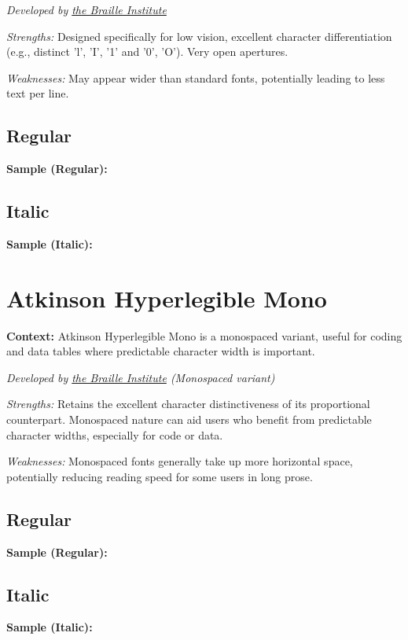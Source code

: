 \emph{Developed by \href{https://brailleinstitute.org/freefont}{the Braille Institute}}
\begin{raggedright}
	\emph{Strengths:} Designed specifically for low vision, excellent character differentiation (e.g., distinct 'l', 'I', '1' and '0', 'O'). Very open apertures.

	\emph{Weaknesses:} May appear wider than standard fonts, potentially leading to less text per line.

	\subsection{Regular}\label{app5:subsec:atkinson-regular}
	\noindent\textbf{Sample (Regular):}
	\FontSample{\atkinsonhyperlegiblefont}

	\subsection{Italic}\label{app5:subsec:atkinson-italic}
	\noindent\textbf{Sample (Italic):}
	\FontSample{{\atkinsonhyperlegiblefont\itshape}}
\end{raggedright}


\pagebreak
\section{Atkinson Hyperlegible Mono}\label{app5:sec:atkinson-mono}
\noindent
\textbf{Context:} Atkinson Hyperlegible Mono is a monospaced variant, useful for coding and data tables where predictable character width is important.

\emph{Developed by \href{https://brailleinstitute.org/freefont}{the Braille Institute} (Monospaced variant)}
\begin{raggedright}
	\emph{Strengths:} Retains the excellent character distinctiveness of its proportional counterpart. Monospaced nature can aid users who benefit from predictable character widths, especially for code or data.

	\emph{Weaknesses:} Monospaced fonts generally take up more horizontal space, potentially reducing reading speed for some users in long prose.

	\subsection{Regular}\label{app5:subsec:mono-regular}
	\noindent\textbf{Sample (Regular):}
	\FontSample{\atkinsonmonofont}

	\subsection{Italic}\label{app5:subsec:mono-italic}
	\noindent\textbf{Sample (Italic):}
	\FontSample{{\atkinsonmonofont\itshape}}
\end{raggedright}


